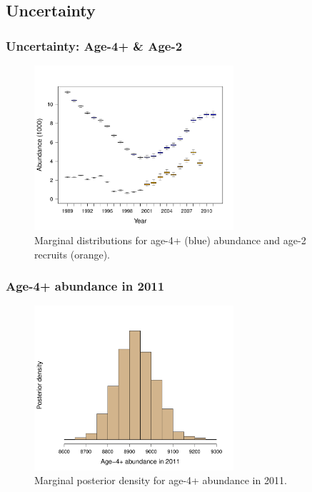 \documentclass{beamer}
\begin{document}
\subsection{Uncertainty} %
\label{sub:uncertainty}
\begin{frame}[t]\frametitle{Uncertainty: Age-4+ \& Age-2}
	\begin{figure}[htbp]
		\centering
			\includegraphics[height=2.4in]{../../FIGS/ASMR/fig:bxplt_Nt4_rt.pdf}
		\caption{Marginal distributions for age-4+ (blue) abundance and age-2 recruits (orange).}
		\label{fig:FIGS_ASMR_fig:bxplt_Nt4_rt}
	\end{figure}
\end{frame}
\begin{frame}[t]\frametitle{Age-4+ abundance in 2011}
	\begin{figure}[htbp]
		\centering
			\includegraphics[height=2.4in]{../../FIGS/ASMR/fig:marg_Nt4.pdf}
		\caption{Marginal posterior density for age-4+ abundance in 2011.}
		\label{fig:FIGS_ASMR_fig:marg_Nt4}
	\end{figure}
\end{frame}
\end{document}

